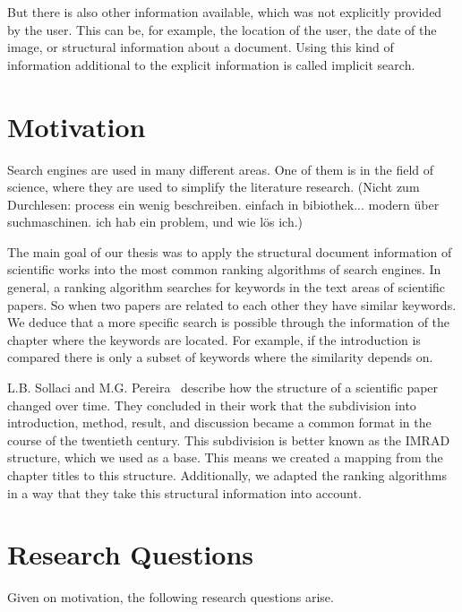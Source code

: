 But there is also other information available, which was not explicitly provided by the user. This can be, for example, the location of the user, the date of the image, or structural information about a document. Using this kind of information additional to the explicit information is called implicit search. %

\section{Motivation}
\label{sec:Motivation}

Search engines are used in many different areas. One of them is in the field of science, where they are used to simplify the literature research. (Nicht zum Durchlesen: process ein wenig beschreiben. einfach in bibiothek... modern über suchmaschinen. ich hab ein problem, und wie lös ich.)

The main goal of our thesis was to apply the structural document information of scientific works into the most common ranking algorithms of search engines. In general, a ranking algorithm searches for keywords in the text areas of scientific papers. So when two papers are related to each other they have similar keywords. We deduce that a more specific search is possible through the information of the chapter where the keywords are located. For example, if the introduction is compared there is only a subset of keywords where the similarity depends on.

 L.B. Sollaci and M.G. Pereira~\cite{Sollaci-The-2004} describe how the structure of a scientific paper changed over time. They concluded in their work that the subdivision into introduction, method, result, and discussion became a common format in the course of the twentieth century. This subdivision is better known as the IMRAD structure, which we used as a base. This means we created a mapping from the chapter titles to this structure. Additionally, we adapted the ranking algorithms in a way that they take this structural information into account.


\section{Research Questions}
\label{sec:research_questions}

Given on motivation, the following research questions arise.

